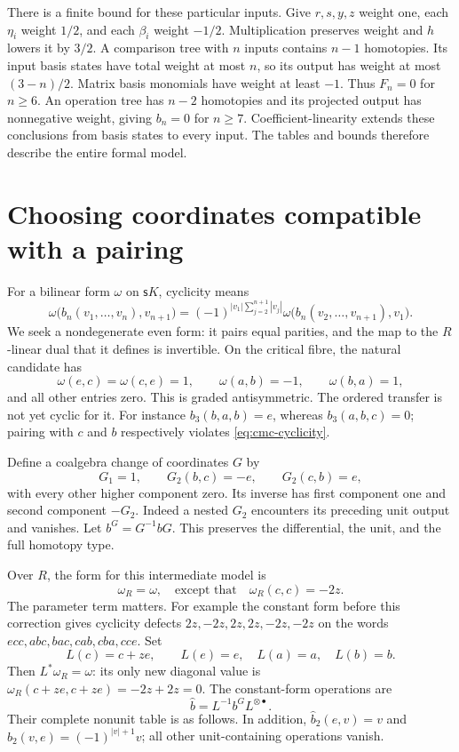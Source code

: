 There is a finite bound for these particular inputs. Give \(r,s,y,z\)
weight one, each \(\eta_i\) weight \(1/2\), and each \(\beta_i\)
weight \(-1/2\). Multiplication preserves weight and \(h\) lowers
it by \(3/2\). A comparison tree with \(n\) inputs contains \(n-1\)
homotopies. Its input basis states have total weight at most \(n\),
so its output has weight at most \((3-n)/2\). Matrix basis
monomials have weight at least \(-1\). Thus \(F_n=0\) for \(n\ge6\).
An operation tree has \(n-2\) homotopies and its projected output
has nonnegative weight, giving \(b_n=0\) for \(n\ge7\).
Coefficient-linearity extends these conclusions from basis states
to every input. The tables and bounds therefore describe the entire
formal model.

\section{Choosing coordinates compatible with a pairing}
\label{sec:cmc-cyclic}

For a bilinear form \(\omega\) on \(\mathsf{s}K\), cyclicity means
\begin{equation}\label{eq:cmc-cyclicity}
 \omega\bigl(b_n(v_1,\ldots,v_n),v_{n+1}\bigr)
 =
 (-1)^{|v_1|\sum_{j=2}^{n+1}|v_j|}
 \omega\bigl(b_n(v_2,\ldots,v_{n+1}),v_1\bigr).
\end{equation}
We seek a nondegenerate even form: it pairs equal parities, and
the map to the \(R\)-linear dual that it defines is invertible.
On the critical fibre, the natural candidate has
\begin{equation}\label{eq:cmc-form}
 \omega(e,c)=\omega(c,e)=1,\qquad
 \omega(a,b)=-1,\qquad\omega(b,a)=1,
\end{equation}
and all other entries zero. This is graded antisymmetric.
The ordered transfer is not yet cyclic for it.
For instance \(b_3(b,a,b)=e\), whereas \(b_3(a,b,c)=0\);
pairing with \(c\) and \(b\) respectively violates
\eqref{eq:cmc-cyclicity}.

Define a coalgebra change of coordinates \(G\) by
\[
 G_1=1,\qquad G_2(b,c)=-e,\qquad G_2(c,b)=e,
\]
with every other higher component zero. Its inverse has first
component one and second component \(-G_2\).
Indeed a nested \(G_2\) encounters its preceding unit output and
vanishes. Let \(b^G=G^{-1}bG\). This preserves the differential,
the unit, and the full homotopy type.

Over \(R\), the form for this intermediate model is
\[
 \omega_R=\omega,\quad\text{except that}\quad
 \omega_R(c,c)=-2z.
\]
The parameter term matters. For example the constant form before
this correction gives cyclicity defects \(2z,-2z,2z,2z,-2z,-2z\)
on the words \(ecc,abc,bac,cab,cba,cce\).
Set
\[
 L(c)=c+ze,\qquad L(e)=e,\quad L(a)=a,\quad L(b)=b.
\]
Then \(L^*\omega_R=\omega\): its only new diagonal value is
\(\omega_R(c+ze,c+ze)=-2z+2z=0\).
The constant-form operations are
\[
 \widehat b=L^{-1}b^G L^{\otimes\bullet}.
\]
Their complete nonunit table is as follows. In addition,
\(\widehat b_2(e,v)=v\) and
\(\widehat b_2(v,e)=(-1)^{|v|+1}v\);
all other unit-containing operations vanish.


